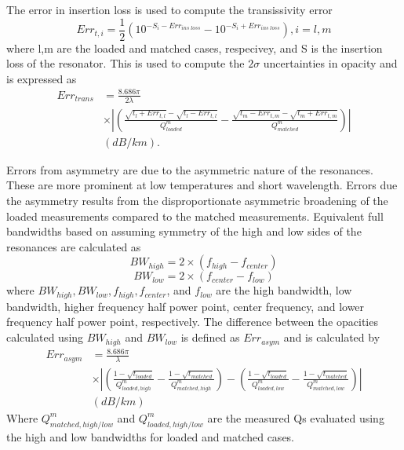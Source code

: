The error in insertion loss is used to compute the transissivity error
\begin{equation}
Err_{t,i} = \frac{1}{2} ( 10^{-S_i - Err_{ins\;loss}} - 10^{-S_i + Err_{ins\;loss}}) , i=l,m
\end{equation}
where l,m are the loaded and matched cases, respecivey, and S is the insertion loss of the resonator. This is used to compute the $2\sigma$ uncertainties in opacity and is expressed as
\begin{equation}
\begin{split}
Err_{trans} &= \frac{8.686 \pi}{2\lambda}\\ 
 &\times \left| \left( \frac{\sqrt{t_l + Err_{t,l}}- \sqrt{t_l - Err_{t,l}}}{Q^m_{loaded}} - \frac{\sqrt{t_m - Err_{t,m}}- \sqrt{t_m + Err_{t,m}}}{Q^m_{matched}} \right) \right|\\
 &(dB/km).
\end{split}
\end{equation}

Errors from asymmetry are due to the asymmetric nature of the resonances. These are more prominent at low temperatures and short wavelength. Errors due the asymmetry results from the disproportionate asymmetric broadening of the loaded measurements compared to the matched measurements. Equivalent full bandwidths based on assuming symmetry of the high and low sides of the resonances are calculated as
\begin{equation}
BW_{high} = 2 \times (f_{high} - f_{center})
\end{equation}
\begin{equation}
BW_{low} = 2 \times (f_{center} - f_{low})
\end{equation}
where $BW_{high}, BW_{low}, f_{high}, f_{center}$, and $f_{low}$ are the high bandwidth, low bandwidth, higher frequency half power point, center frequency, and lower frequency half power point, respectively. The difference between the opacities calculated using $BW_{high}$ and $BW_{low}$ is defined as $Err_{asym}$ and is calculated by
\begin{equation}
\begin{split}
Err_{asym} &= \frac{8.686 \pi}{\lambda} 
\\ &\times \left| \left( \frac{1-\sqrt{t_{loaded}}}{Q^m_{loaded,high}} - \frac{1-\sqrt{t_{matched}}}{Q^m_{matched,high}} \right) - \left( \frac{1-\sqrt{t_{loaded}}}{Q^m_{loaded,low}} - \frac{1-\sqrt{t_{matched}}}{Q^m_{matched,low}} \right) \right|\\
 &(dB/km)
\end{split}
\end{equation}
Where $Q^m_{matched,high/low}$ and $Q^m_{loaded,high/low}$ are the measured Qs evaluated using the high and low bandwidths for loaded and matched cases. 

